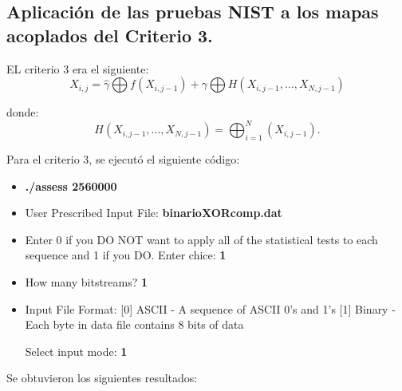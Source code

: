 \documentclass[12pt,3p]{elsarticle}
\begin{document}
\subsection{Aplicación de las pruebas NIST a los mapas acoplados del Criterio 3.}

EL criterio 3 era el siguiente:
\begin{equation}
X_{i,j}= \hat{\gamma} \bigoplus f(X_{i,j-1})+ \gamma \bigoplus H(X_{i,j-1},...,X_{N,j-1})
\end{equation}

donde:
\begin{equation}
H(X_{i,j-1},...,X_{N,j-1}) = \bigoplus _{i=1}^{N}(X_{i,j-1}).
\end{equation}



Para el criterio 3, se ejecutó el siguiente código:

\begin{itemize}
\item \textbf{./assess 2560000}
\item User Prescribed Input File: \textbf{binarioXORcomp.dat}
\item    Enter 0 if you DO NOT want to apply all of the
         statistical tests to each sequence and 1 if you DO. Enter chice: \textbf{1}
                  
\item  How many bitstreams? \textbf{1}

\item Input File Format:
    [0] ASCII - A sequence of ASCII 0's and 1's
    [1] Binary - Each byte in data file contains 8 bits of data

   Select input mode:  \textbf{1}
\end{itemize}


Se obtuvieron los siguientes resultados:
\end{document}
